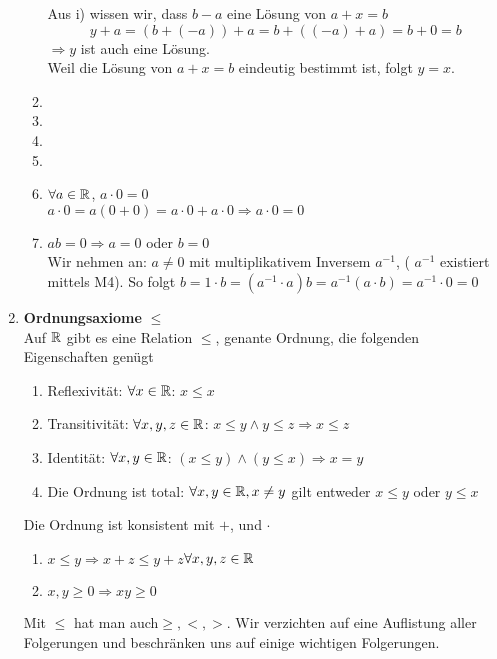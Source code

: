 \begin{enumerate}
\begin{enumerate}
\noindent Aus i) wissen wir, dass $b-a$ eine Lösung von $a+x=b$ \[y+a=\left( b+(-a)\right)+a=b+\left( (-a)+a\right)=b+0=b\]
$\Rightarrow y$ ist auch eine Lösung.\\
Weil die Lösung von $a+x=b$ eindeutig bestimmt ist, folgt $y=x$.
\item
\item
\item
\item
{}
\item $\forall a\in\mathbb{R}$, $a\cdot 0=0$\\
$a\cdot 0=a(0+0)=a\cdot 0+a\cdot 0\Rightarrow a\cdot 0=0$
\item $ab=0\Rightarrow a=0$ oder $b=0$\\
Wir nehmen an: $a\not=0$ mit multiplikativem Inversem $a^{-1}$, ( $a^{-1}$ existiert mittels M4). So folgt $b=1\cdot b=\left( a^{-1}\cdot a\right)b=a^{-1}(a\cdot b)=a^{-1}\cdot 0=0$
\end{enumerate}
\item \textbf{Ordnungsaxiome} $\leq$\\
Auf $\mathbb{R}$ gibt es eine Relation $\leq$, genante Ordnung, die folgenden Eigenschaften genügt
\begin{enumerate}
\item Reflexivität: $\forall x\in\mathbb{R}$: $x\leq x$
\item Transitivität: $\forall x,y,z\in\mathbb{R}$: $x\leq y\land y\leq z\Rightarrow x\leq z$
\item Identität: $\forall x,y\in\mathbb{R}$: $(x\leq y) \wedge(y\leq x)\Rightarrow x=y$
\item Die Ordnung ist total: $\forall x,y\in\mathbb{R}, x \neq y$ gilt entweder $x\leq y$ oder $y\leq x$
\end{enumerate}
Die Ordnung ist konsistent mit $+$, und $\cdot$
\begin{enumerate}
\item $x\leq y\Rightarrow x+z\leq y+z$\hspace{10mm}$\forall x,y,z\in\mathbb{R}$
\item $x,y\geq 0\Rightarrow xy\geq 0$
\end{enumerate}
Mit $\leq$ hat man auch$\geq,<,>$. Wir verzichten auf eine Auflistung aller Folgerungen und beschränken uns auf einige wichtigen Folgerungen.

\end{enumerate}
